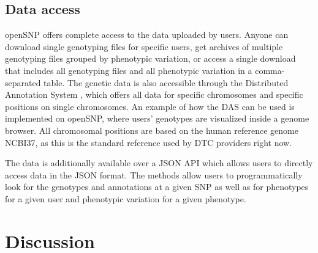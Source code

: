 \documentclass[10pt]{article}
\begin{document}
\subsection*{Data access}
openSNP offers complete access to the data uploaded by users. Anyone can download single genotyping files for specific users, get archives of multiple genotyping files 
grouped by phenotypic variation, or access a single download that includes all genotyping files and all phenotypic variation in a comma-separated table. The genetic data is also 
accessible through the Distributed Annotation System \cite{Dowell2001,Jenkinson2008}, which offers all data for specific chromosomes and specific positions on single chromosomes. 
An example of how the DAS can be used is implemented on openSNP, where users' genotypes are visualized inside a genome browser. All chromosomal positions are based on the human reference genome NCBI37, as this is the standard reference used by DTC providers right now.

The data is additionally available over a JSON API which allows users to directly access data in the JSON format. The methods allow users to programmatically look for the genotypes and annotations at a given SNP as well as for phenotypes for a given user and phenotypic variation for a given phenotype.

\section*{Discussion}

%
%
\end{document}
